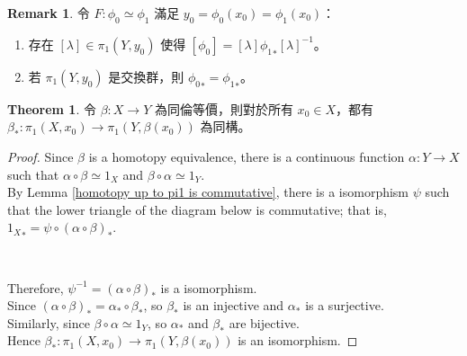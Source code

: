 \documentclass[12pt]{article}
\theoremstyle{definition}
\newtheorem{theorem}[definition]{Theorem}
\newtheorem{remark}[definition]{Remark}
\newcommand\<{\langle}
\renewcommand\>{\rangle}
\begin{document}
\begin{CJK}{UTF8}{bsmi}
\begin{remark}
    令 $F:\phi_0\simeq\phi_1$ 滿足 $y_0=\phi_0(x_0)=\phi_1(x_0)$：
    \begin{enumerate}
        \item 存在 $[\lambda]\in\pi_1(Y, y_0)$ 使得 $[\phi_0]=[\lambda]{\phi_1}_*[\lambda]^{-1}$。
        \item 若 $\pi_1(Y, y_0)$ 是交換群，則 ${\phi_0}_*={\phi_1}_*$。
    \end{enumerate}
\end{remark}

\begin{theorem}
    令 $\beta:X\to Y$ 為同倫等價，則對於所有 $x_0\in X$，都有 $\beta_*:\pi_1(X, x_0)\to\pi_1(Y, \beta(x_0))$ 為同構。
\end{theorem}
\begin{proof}
    Since $\beta$ is a homotopy equivalence, there is a continuous function $\alpha:Y\to X$ such that $\alpha\circ\beta\simeq 1_X$ and $\beta\circ\alpha\simeq 1_Y$. \\
    By Lemma \ref{homotopy up to pi1 is commutative}, there is a isomorphism $\psi$ such that the lower triangle of the diagram below is commutative; that is, ${1_X}_*=\psi\circ(\alpha\circ\beta)_*$.
    \begin{center}
     \\
    \end{center}
    Therefore, $\psi^{-1}=(\alpha\circ\beta)_*$ is a isomorphism. \\
    Since $(\alpha\circ\beta)_*=\alpha_*\circ\beta_*$, so $\beta_*$ is an injective and $\alpha_*$ is a surjective. \\
    Similarly, since $\beta\circ\alpha\simeq 1_Y$, so $\alpha_*$ and $\beta_*$ are bijective. \\
    Hence $\beta_*:\pi_1(X, x_0)\to\pi_1(Y, \beta(x_0))$ is an isomorphism.
\end{proof}


\end{CJK}
\end{document}
